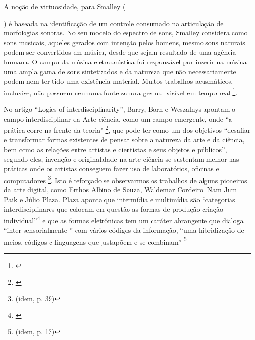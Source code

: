 A noção de virtuosidade, para Smalley ({\citeyear{Smalley1996}) é baseada na identificação de um controle consumado na articulação de morfologias sonoras. No seu modelo do espectro de sons, Smalley considera como sons musicais, aqueles gerados com intenção pelos homens, mesmo sons naturais podem ser convertidos em música, desde que sejam resultado de uma agência humana. O campo da música eletroacústica foi responsável por inserir na música uma ampla gama de sons sintetizados e da natureza que não necessariamente podem nem ter tido uma existência material. Muitos trabalhos acusmáticos, inclusive, não possuem nenhuma fonte sonora gestual visível em tempo real \footnote{\cite[95, 101]{Smalley1996}}.






No artigo ``Logics of interdisciplinarity'', Barry, Born e Weszalnys apontam o campo interdisciplinar da Arte-ciência, como um campo emergente, onde ``a prática corre na frente da teoria'' \footnote{\cite{Barry2008}}, que pode ter como um dos objetivos ``desafiar e transformar formas existentes de pensar sobre a natureza da arte e da ciência, bem como as relações entre artistas e cientistas e seus objetos e públicos'', segundo eles, invenção e originalidade na arte-ciência se sustentam melhor nas práticas onde os artistas conseguem fazer uso de laboratórios, oficinas e computadores \footnote{(idem, p. 39)}. Isto é reforçado se observarmos os trabalhos de alguns pioneiros da arte digital, como Erthos Albino de Souza, Waldemar Cordeiro, Nam Jum Paik e Júlio Plaza. 
Plaza aponta que intermídia e multimídia são ``categorias interdisciplinares  que colocam em questão as formas de produção-criação individual''\footnote{\cite[66]{JulioPlaza1969}} e que as formas eletrônicas tem um caráter abrangente que dialoga ``inter sensorialmente '' com vários códigos da informação, ``uma hibridização de meios, códigos e linguagens que justapõem e se combinam'' \footnote{(idem, p. 13)}





}
